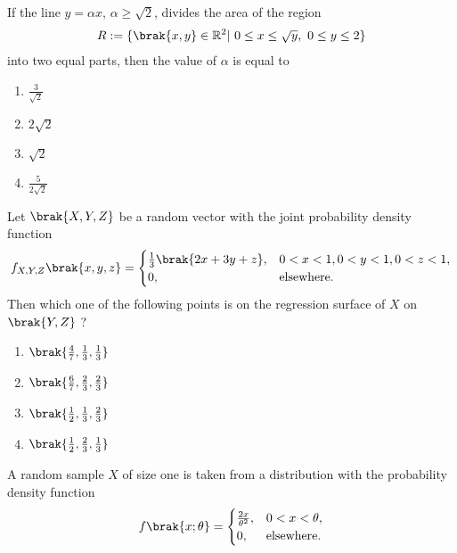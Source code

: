 \iffalse
\chapter{2022}
\author{AI24BTECH11009}
\section{st}
\fi

\item If the line $y = \alpha x$, $\alpha \geq \sqrt{2}$, divides the area of the region 
\begin{align*}
    R:= \{\brak{x,y} \in \mathbb{R}^2|\ 0 \leq x \leq \sqrt{y},\ 0 \leq y \leq 2\}
\end{align*}
into two equal parts, then the value of $\alpha$ is equal to
\begin{enumerate}
    \item $\frac{3}{\sqrt{2}}$
    \item $2\sqrt{2}$
    \item $\sqrt{2}$
    \item $\frac{5}{2\sqrt{2}}$ \\
\end{enumerate}
\item Let $\brak{X, Y, Z}$ be a random vector with the joint probability density function 
\begin{align*}
    f_{X, Y, Z}\brak{x, y, z} = \begin{cases}
        \frac{1}{3}\brak{2x + 3y + z}, & 0 < x < 1,0 < y < 1,0 < z < 1, \\
        0, & \text{elsewhere}.
    \end{cases}
\end{align*}
Then which one of the following points is on the regression surface of $X$ on $\brak{Y, Z}$ ?
\begin{enumerate}
    \item $\brak{\frac{4}{7}, \frac{1}{3}, \frac{1}{3}}$
    \item $\brak{\frac{6}{7}, \frac{2}{3}, \frac{2}{3}}$
    \item $\brak{\frac{1}{2}, \frac{1}{3}, \frac{2}{3}}$
    \item $\brak{\frac{1}{2}, \frac{2}{3}, \frac{1}{3}}$ \\
\end{enumerate}
\item A random sample $X$ of size one is taken from a distribution with the probability density function 
\begin{align*}
    f\brak{x; \theta} = \begin{cases}
        \frac{2x}{\theta^2}, & 0 < x < \theta, \\
        0, & \text{elsewhere}.
    \end{cases}
\end{align*}
